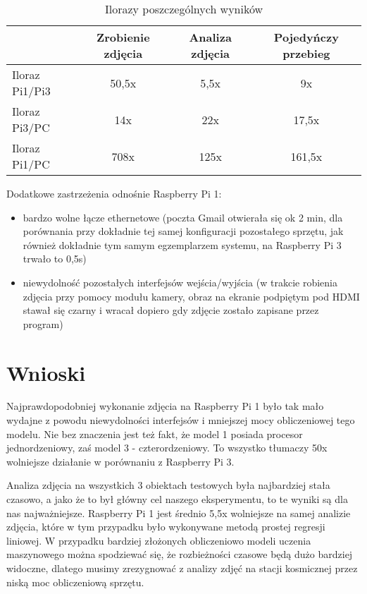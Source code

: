 \begin{table}[H]
    \centering
    \begin{threeparttable}
        \caption{Ilorazy poszczególnych wyników}
        \begin{tabular}{|lccc|}
            \toprule
            & Zrobienie zdjęcia & Analiza zdjęcia & Pojedyńczy przebieg \\
            \midrule
            Iloraz Pi1/Pi3 & 50,5x & 5,5x & 9x \\
            Iloraz Pi3/PC & 14x & 22x & 17,5x \\
            Iloraz Pi1/PC & 708x & 125x & 161,5x \\
            \bottomrule
        \end{tabular}
    \end{threeparttable}
\end{table}

\large Dodatkowe zastrzeżenia odnośnie Raspberry Pi 1: \normalsize
\begin{itemize}
    \item bardzo wolne łącze ethernetowe
    \footnotesize (poczta Gmail otwierała się ok 2 min, dla porównania przy dokładnie
    tej samej konfiguracji pozostałego sprzętu, jak również dokładnie tym samym egzemplarzem systemu, na
    Raspberry Pi 3 trwało to 0,5s) \normalsize \\
    \item niewydolność pozostałych interfejsów wejścia/wyjścia
    \footnotesize (w trakcie robienia zdjęcia przy pomocy modułu kamery, obraz
    na ekranie podpiętym pod HDMI stawał się czarny i wracał dopiero gdy zdjęcie zostało zapisane przez
    program) \normalsize \\
\end{itemize}

\section{Wnioski}\label{sec:performance_conclusion}

Najprawdopodobniej wykonanie zdjęcia na Raspberry Pi 1 było tak mało wydajne z powodu
niewydolności interfejsów i mniejszej mocy obliczeniowej tego modelu.
Nie bez znaczenia jest też fakt, że model 1 posiada procesor jednordzeniowy, zaś model 3 - czterordzeniowy.
To wszystko tłumaczy 50x wolniejsze działanie w porównaniu z Raspberry Pi 3.

Analiza zdjęcia na wszystkich 3 obiektach testowych była najbardziej stała czasowo, a jako
że to był główny cel naszego eksperymentu, to te wyniki są dla nas najważniejsze. Raspberry Pi 1
jest średnio 5,5x wolniejsze na samej analizie zdjęcia, które w tym przypadku było wykonywane
metodą prostej regresji liniowej.
W przypadku bardziej złożonych obliczeniowo modeli uczenia maszynowego można spodziewać się, że
rozbieżności czasowe będą dużo bardziej widoczne, dlatego musimy zrezygnować z analizy zdjęć
na stacji kosmicznej przez niską moc obliczeniową sprzętu.

